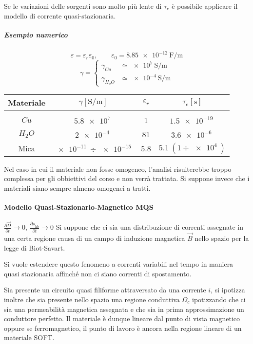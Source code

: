 Se le variazioni delle sorgenti sono molto più lente di $\tau_e$ è possibile applicare
il modello di corrente quasi-stazionaria.
\newpage
\subparagraph{Esempio numerico}
$$
\varepsilon = \varepsilon_r\varepsilon_0,\qquad \varepsilon_0 = \SI{8.85e-12}{\farad\per\meter}
$$
$$
\gamma = 
\begin{cases}
\gamma_{Cu} &\simeq \SI{e7}{\siemens\per\meter}\\
\gamma_{H_2O} &\simeq \SI{e-4}{\siemens\per\meter}
\end{cases}
$$
\begin{table}[H]\centering
\begin{tabular}{|c|c|c|c|}
 \hline Materiale & $\gamma[\si{\siemens\per\meter}]$ & $\varepsilon_r$ & $\tau_e[\si{\second}]$ \\
 \hline  &                                          &               &               \\
 $Cu$        & $\SI{5.8e7}{}$                    &   1           &   $\SI{1.5e-19}{}$ \\ 
 $H_2O$           & $\SI{2e-4}{} $                   &       81         & $\SI{3.6e-6}{}$ \\  
 Mica               & $\SI{e-11}{}\div\SI{e-15}{}$       &  5.8        &   $\SI{5.1}{}\left(1\div\SI{e4}{}\right)$ \\ \hline
\end{tabular}
\end{table}

Nel caso in cui il materiale non fosse omogeneo, l'analisi risulterebbe troppo complessa per gli
obbiettivi del corso e non verrà trattata. Si suppone invece che i materiali siano sempre almeno 
omogenei a tratti.

\paragraph{Modello Quasi-Stazionario-Magnetico MQS}
$\frac{\partial\vec{D}}{\partial t} \to 0$, $\frac{\partial\rho_\text{lib}}{\partial t}\to 0$
Si suppone che ci sia una distribuzione di correnti assegnate in una certa regione causa
di un campo di induzione magnetica $\vec{B}$ nello spazio per la legge di Biot-Savart.

Si vuole estendere questo fenomeno a correnti variabili nel tempo in maniera quasi 
stazionaria affinché non ci siano correnti di spostamento.

Sia presente un circuito quasi filiforme attraversato da una corrente $i$, si ipotizza 
inoltre che sia presente nello spazio una regione conduttiva $\Omega_c$ ipotizzando
che ci sia una permeabilità magnetica assegnata e che sia in prima approssimazione un
conduttore perfetto. Il materiale è dunque lineare dal punto di vista magnetico
oppure se ferromagnetico, il punto di lavoro è ancora nella regione lineare di un 
materiale SOFT.

